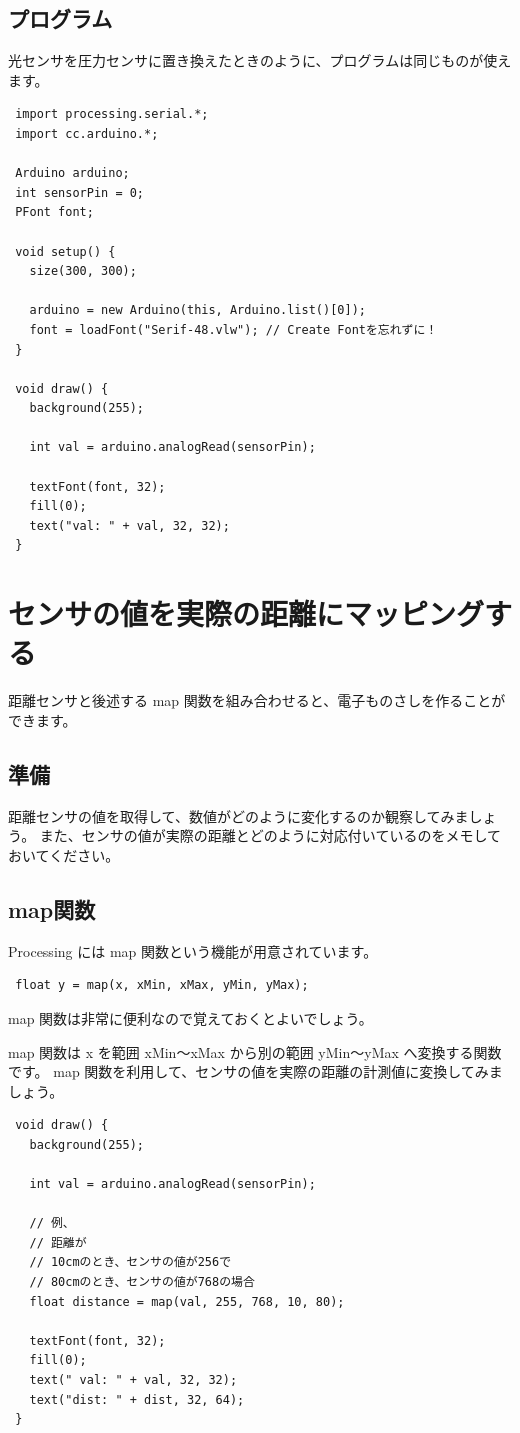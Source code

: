 \documentclass[11pt,a4paper]{jarticle}
\begin{document}
\subsection*{プログラム}
光センサを圧力センサに置き換えたときのように、プログラムは同じものが使えます。
\begin{lstlisting}
 import processing.serial.*;
 import cc.arduino.*;
 
 Arduino arduino;
 int sensorPin = 0;
 PFont font;
 
 void setup() {
   size(300, 300);

   arduino = new Arduino(this, Arduino.list()[0]); 
   font = loadFont("Serif-48.vlw"); // Create Fontを忘れずに！
 }

 void draw() {
   background(255);

   int val = arduino.analogRead(sensorPin);

   textFont(font, 32);
   fill(0);
   text("val: " + val, 32, 32);
 }
\end{lstlisting}


\section{センサの値を実際の距離にマッピングする}
距離センサと後述する map 関数を組み合わせると、電子ものさしを作ることができます。

\subsection*{準備}
距離センサの値を取得して、数値がどのように変化するのか観察してみましょう。
また、センサの値が実際の距離とどのように対応付いているのをメモしておいてください。

\subsection*{map関数}
Processing には map 関数という機能が用意されています。
\begin{lstlisting}
 float y = map(x, xMin, xMax, yMin, yMax);
\end{lstlisting}
map 関数は非常に便利なので覚えておくとよいでしょう。

map 関数は x を範囲 xMin〜xMax から別の範囲 yMin〜yMax へ変換する関数です。
map 関数を利用して、センサの値を実際の距離の計測値に変換してみましょう。

\begin{lstlisting}
 void draw() {
   background(255);

   int val = arduino.analogRead(sensorPin);

   // 例、
   // 距離が
   // 10cmのとき、センサの値が256で
   // 80cmのとき、センサの値が768の場合
   float distance = map(val, 255, 768, 10, 80);

   textFont(font, 32);
   fill(0);
   text(" val: " + val, 32, 32);
   text("dist: " + dist, 32, 64);
 }
\end{lstlisting}
\end{document}
